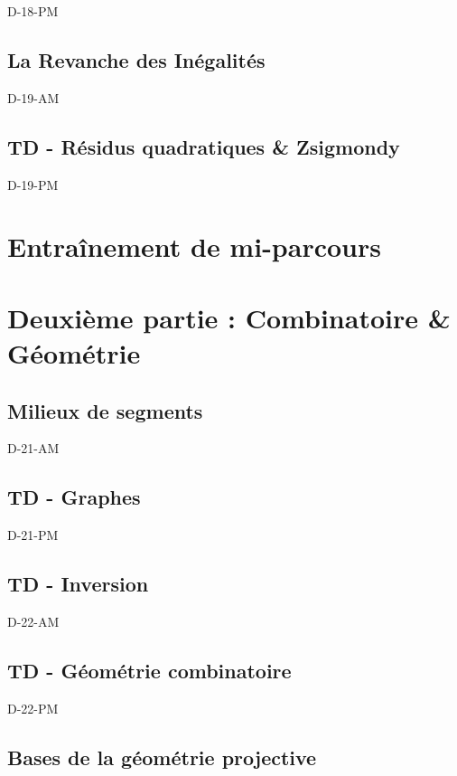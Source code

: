 \documentclass[poly,trombi]{valbonne}
\begin{document}
{D-18-PM}

\subsection{La Revanche des Inégalités}

{D-19-AM}

\subsection{TD - Résidus quadratiques \& Zsigmondy}
{D-19-PM}


\section{Entraînement de mi-parcours}



\section{Deuxième partie : Combinatoire \& Géométrie}

\subsection{Milieux de segments}

{D-21-AM}

\subsection{TD - Graphes}

{D-21-PM}

\subsection{TD - Inversion}

{D-22-AM}

\subsection{TD - Géométrie combinatoire}

{D-22-PM}

\subsection{Bases de la géométrie projective}
\end{document}
